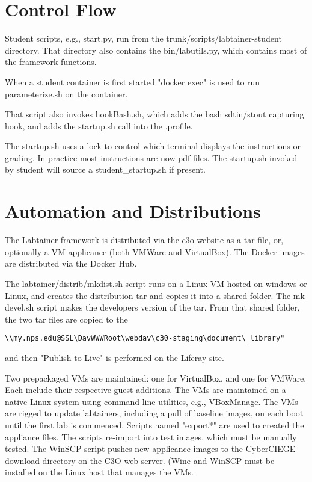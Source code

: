 \documentclass[12pt]{article}
\begin{document}
\section {Control Flow}
Student scripts, e.g., start.py, run from the trunk/scripts/labtainer-student directory.
That directory also contains the bin/labutils.py, which contains most of the framework
functions.

When a student container is first started "docker exec" is used
to run parameterize.sh on the container.

That script also invokes hookBash.sh, which adds the bash
sdtin/stout capturing hook, and adds the startup.sh call
into the .profile.

The startup.sh uses a lock to control which
terminal displays the instructions or grading.  In practice most
instructions are now pdf files.
The startup.sh invoked by student will source a student\_startup.sh if present.

\section{Automation and Distributions}
The Labtainer framework is distributed via the c3o website as a tar file, or, optionally a
VM applicance (both VMWare and VirtualBox).  The Docker images are distributed via the Docker Hub.

The labtainer/distrib/mkdist.sh script runs on a Linux VM hosted on windows or Linux, and creates the distribution tar 
and copies it into a shared folder.  The mk-devel.sh script makes the developers version of the tar.
From that shared folder, the two tar files are copied to the 
\begin{verbatim}
\\my.nps.edu@SSL\DavWWWRoot\webdav\c30-staging\document\_library" 
\end{verbatim}
\noindent and then "Publish to Live" is 
performed on the Liferay site.

Two prepackaged VMs are maintained: one for VirtualBox, and one for VMWare.  Each include
their respective guest additions.  The VMs are maintained on a native Linux system using command line
utilities, e.g., VBoxManage.  The VMs are rigged to update labtainers, including a pull of
baseline images, on each boot until the first lab is commenced.  Scripts named "export*" are
used to created the appliance files.  The scripts re-import into test images, which must be
manually tested.  The WinSCP script pushes new applicance images to the CyberCIEGE download
directory on the C3O web server.  (Wine and WinSCP must be installed on the Linux host that
manages the VMs.
\end{document}
